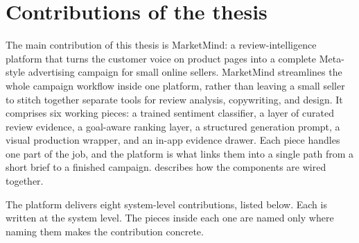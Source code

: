 \documentclass[12pt,a4paper]{report}
\begin{document}
\section{Contributions of the thesis}
\label{sec:contributions}

The main contribution of this thesis is MarketMind: a review-intelligence platform that turns the customer voice on product pages into a complete Meta-style advertising campaign for small online sellers. MarketMind streamlines the whole campaign workflow inside one platform, rather than leaving a small seller to stitch together separate tools for review analysis, copywriting, and design. It comprises six working pieces: a trained sentiment classifier, a layer of curated review evidence, a goal-aware ranking layer, a structured generation prompt, a visual production wrapper, and an in-app evidence drawer. Each piece handles one part of the job, and the platform is what links them into a single path from a short brief to a finished campaign.  describes how the components are wired together.

The platform delivers eight system-level contributions, listed below. Each is written at the system level. The pieces inside each one are named only where naming them makes the contribution concrete.
\end{document}

